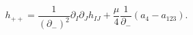 \begin{equation}\label{const6}
h_{++} = \frac1{(\partial_-)^2} \partial_I  \partial_J h_{IJ}
 + \frac{\mu}4  \frac1{\partial_-}(a_4 - a_{123}).
\end{equation}

